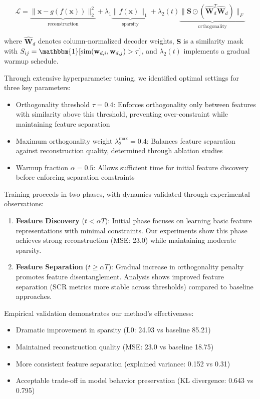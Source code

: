 \documentclass{article} %
\begin{document}
\begin{equation}
\mathcal{L} = \underbrace{\|\mathbf{x} - g(f(\mathbf{x}))\|_2^2}_{\text{reconstruction}} + \lambda_1\underbrace{\|f(\mathbf{x})\|_1}_{\text{sparsity}} + \lambda_2(t)\underbrace{\|\mathbf{S} \odot (\hat{\mathbf{W}}_d^T\hat{\mathbf{W}}_d)\|_F}_{\text{orthogonality}}
\end{equation}

where $\hat{\mathbf{W}}_d$ denotes column-normalized decoder weights, $\mathbf{S}$ is a similarity mask with $S_{ij} = \mathbbm{1}[\text{sim}(\mathbf{w}_{d,i}, \mathbf{w}_{d,j}) > \tau]$, and $\lambda_2(t)$ implements a gradual warmup schedule.

Through extensive hyperparameter tuning, we identified optimal settings for three key parameters:
\begin{itemize}
    \item Orthogonality threshold $\tau = 0.4$: Enforces orthogonality only between features with similarity above this threshold, preventing over-constraint while maintaining feature separation
    \item Maximum orthogonality weight $\lambda_2^{\text{max}} = 0.4$: Balances feature separation against reconstruction quality, determined through ablation studies
    \item Warmup fraction $\alpha = 0.5$: Allows sufficient time for initial feature discovery before enforcing separation constraints
\end{itemize}

Training proceeds in two phases, with dynamics validated through experimental observations:
\begin{enumerate}
    \item \textbf{Feature Discovery} ($t < \alpha T$): Initial phase focuses on learning basic feature representations with minimal constraints. Our experiments show this phase achieves strong reconstruction (MSE: 23.0) while maintaining moderate sparsity.
    \item \textbf{Feature Separation} ($t \geq \alpha T$): Gradual increase in orthogonality penalty promotes feature disentanglement. Analysis shows improved feature separation (SCR metrics more stable across thresholds) compared to baseline approaches.
\end{enumerate}

Empirical validation demonstrates our method's effectiveness:
\begin{itemize}
    \item Dramatic improvement in sparsity (L0: 24.93 vs baseline 85.21)
    \item Maintained reconstruction quality (MSE: 23.0 vs baseline 18.75)
    \item More consistent feature separation (explained variance: 0.152 vs 0.31)
    \item Acceptable trade-off in model behavior preservation (KL divergence: 0.643 vs 0.795)
\end{itemize}
\end{document}
